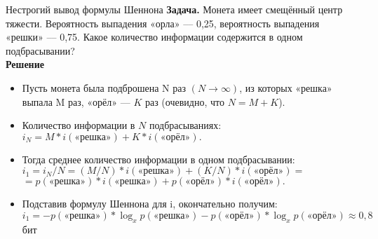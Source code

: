 \begin{frame}[t]{Нестрогий вывод формулы Шеннона}
	\noindent\textbf{Задача.}
	\color{black}
	Монета имеет смещённый центр тяжести. Вероятность выпадения «орла» –-- 0,25, вероятность выпадения «решки» –-- 0,75. Какое количество информации содержится в одном подбрасывании?\\
	\vspace{0.5cm}
	\noindent\textbf{Решение}
	\color{black}
	\begin{itemize}
		\item[\textbullet] Пусть монета была подброшена N раз $(N\rightarrow\infty)$, из которых «решка» выпала M раз, «орёл» — $K$ раз (очевидно, что $N=M+K$).\\
		\item[\textbullet] Количество информации в $N$ подбрасываниях: $i_N = M*i(\mbox{«решка»})+K*i(\mbox{«орёл»}).$\\
		\item[\textbullet] Тогда среднее количество информации в одном подбрасывании:\\
		$i_1=i_N/N=(M/N)*i(\mbox{«решка»})+(K/N)*i(\mbox{«орёл»})=$\\
		$=p(\mbox{«решка»})*i(\mbox{«решка»})+p(\mbox{«орёл»})*i(\mbox{«орёл»}).$
		\item[\textbullet] Подставив формулу Шеннона для i, окончательно получим:\\
		$i_1=-p(\mbox{«решка»})*\log_xp(\mbox{«решка»})-p(\mbox{«орёл»})*\log_xp(\mbox{«орёл»})\approx0,8$ бит
	\end{itemize}
\end{frame}